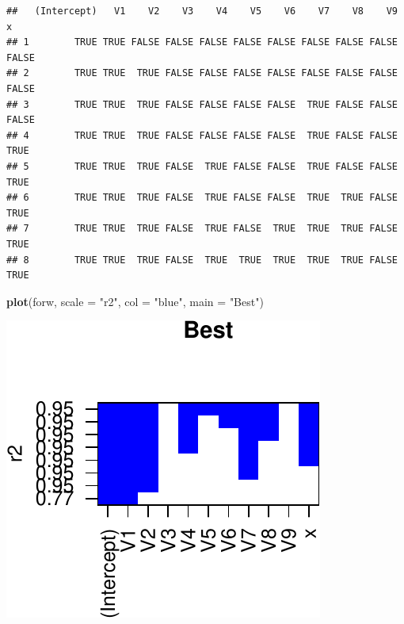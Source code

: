 \documentclass[]{article}
\newenvironment{Shaded}{\begin{snugshade}}{\end{snugshade}}
\newcommand{\DataTypeTok}[1]{\textcolor[rgb]{0.13,0.29,0.53}{#1}}
\newcommand{\KeywordTok}[1]{\textcolor[rgb]{0.13,0.29,0.53}{\textbf{#1}}}
\newcommand{\NormalTok}[1]{#1}
\newcommand{\OperatorTok}[1]{\textcolor[rgb]{0.81,0.36,0.00}{\textbf{#1}}}
\newcommand{\StringTok}[1]{\textcolor[rgb]{0.31,0.60,0.02}{#1}}
\begin{document}
\begin{Shaded}
\end{Shaded}

\begin{verbatim}
##   (Intercept)   V1    V2    V3    V4    V5    V6    V7    V8    V9     x
## 1        TRUE TRUE FALSE FALSE FALSE FALSE FALSE FALSE FALSE FALSE FALSE
## 2        TRUE TRUE  TRUE FALSE FALSE FALSE FALSE FALSE FALSE FALSE FALSE
## 3        TRUE TRUE  TRUE FALSE FALSE FALSE FALSE  TRUE FALSE FALSE FALSE
## 4        TRUE TRUE  TRUE FALSE FALSE FALSE FALSE  TRUE FALSE FALSE  TRUE
## 5        TRUE TRUE  TRUE FALSE  TRUE FALSE FALSE  TRUE FALSE FALSE  TRUE
## 6        TRUE TRUE  TRUE FALSE  TRUE FALSE FALSE  TRUE  TRUE FALSE  TRUE
## 7        TRUE TRUE  TRUE FALSE  TRUE FALSE  TRUE  TRUE  TRUE FALSE  TRUE
## 8        TRUE TRUE  TRUE FALSE  TRUE  TRUE  TRUE  TRUE  TRUE FALSE  TRUE
\end{verbatim}

\begin{Shaded}
\begin{Highlighting}[]
\KeywordTok{plot}\NormalTok{(forw, }\DataTypeTok{scale =} \StringTok{"r2"}\NormalTok{, }\DataTypeTok{col =} \StringTok{"blue"}\NormalTok{, }\DataTypeTok{main =} \StringTok{"Best"}\NormalTok{)}
\end{Highlighting}
\end{Shaded}

\begin{center}\includegraphics{sol_A3_files/figure-latex/unnamed-chunk-24-1} \end{center}
\end{document}
